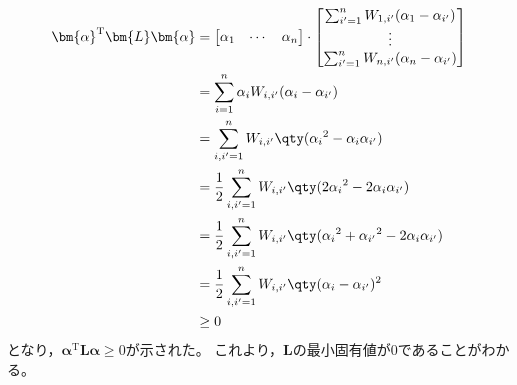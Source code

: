 \documentclass[class=jsarticle, crop=false, dvipdfmx, fleqn]{standalone}
\begin{document}
\begin{align*}
    \bm{\alpha}^\mathrm{T} \bm{L} \bm{\alpha}
        & =
            \begin{bmatrix}
                \alpha_1 & \cdots & \alpha_n
            \end{bmatrix}
            \cdot
            \begin{bmatrix}
                \sum_{i'=1}^{n} W_{1, i'} (\alpha_1 - \alpha_{i'}) \\
                \vdots \\
                \sum_{i'=1}^{n} W_{n, i'} (\alpha_n - \alpha_{i'})
            \end{bmatrix}
        \\
        & = \sum_{i=1}^{n} \alpha_i W_{i, i'} (\alpha_i - \alpha_{i'})
        \\
        & = \sum_{i, i' = 1}^{n} W_{i, i'} \qty({\alpha_i}^2 - \alpha_i \alpha_{i'})
        \\
        & = \frac{1}{2} \sum_{i, i' = 1}^{n} W_{i, i'} \qty(2 {\alpha_i}^2 - 2 \alpha_i \alpha_{i'})
        \\
        & = \frac{1}{2} \sum_{i, i' = 1}^{n} W_{i, i'} \qty({\alpha_i}^2 + {\alpha_{i'}}^2 - 2 \alpha_i \alpha_{i'})
        \\
        & = \frac{1}{2} \sum_{i, i' = 1}^{n} W_{i, i'} \qty(\alpha_i - \alpha_{i'})^2
        \\
        & \ge 0
\end{align*}
となり，\(\bm{\alpha}^\mathrm{T} \bm{L} \bm{\alpha} \ge 0\)が示された。
これより，\(\bm{L}\)の最小固有値が\(0\)であることがわかる。
\end{document}
